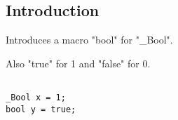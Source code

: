 
\subsection{Introduction}

Introduces a macro "bool" for "\_Bool".

Also "true" for 1 and "false" for 0.

\begin{verbatim}

_Bool x = 1;
bool y = true;

\end{verbatim}


